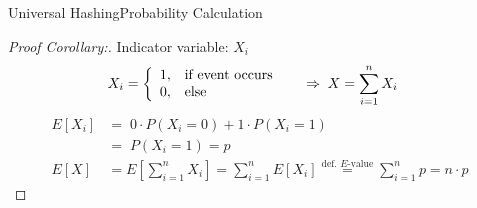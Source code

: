 \begin{frame}{Universal Hashing}{Probability Calculation}
  \begin{proof}[Proof Corollary:]
    Indicator variable: {\color{Mittel-Blau}$X_i$}\\
    \vspace*{-1.5em}
    {\color{Mittel-Blau}
    \begin{align*}
      X_i &=
        \left\lbrace
          \begin{array}{ll}
            1, & \text{if event occurs}\\
            0, & \text{else}
          \end{array}
        \right. \hspace{1.5em}
        \Rightarrow \; X = \sum_{i=1}^{n} X_i
    \end{align*}}
    \vspace*{-1.0em}
    {\color{Mittel-Blau}
    \begin{align*}
      E[X_i]
        &= \; 0 \cdot P(X_i = 0) + 1 \cdot P(X_i = 1)\\
      {} &= \; P(X_i = 1) = p\\[0.5em]
      E[X] &= E\left[\sum_{i=1}^{n} X_i\right]
        = \sum_{i=1}^{n} E[X_i]
        \stackrel{\text{def. $E$-value}}{=}
        \sum_{i=1}^{n} p = n \cdot p
    \end{align*}}
    \qedhere
  \end{proof}
\end{frame}
